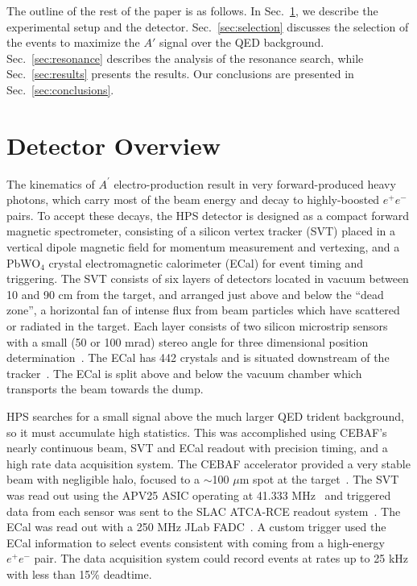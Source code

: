 \documentclass[twocolumn, showpacs, preprintnumbers,prd, superscriptaddress]{revtex4-1}
\newcommand{\pos}{e^{+}}
\newcommand{\ele}{e^{-}}
\newcommand{\epem}{\pos\ele}
\newcommand{\aprime}{A^\prime}
\begin{document}
        The outline of the rest of the paper is as follows. 
        In Sec.~\ref{sec:detector}, we describe the experimental setup and the
        detector. Sec.~\ref{sec:selection} discusses the selection of the 
        events to maximize the $A'$ signal over the QED background.  
        Sec.~\ref{sec:resonance} describes the analysis of the resonance search,
        while Sec.~\ref{sec:results} presents the results.  Our conclusions are 
        presented in Sec.~\ref{sec:conclusions}. 
   
    \section{Detector Overview}\label{sec:detector}	
        
        The kinematics of $\aprime$ electro-production result in very 
        forward-produced heavy photons, which carry most of the beam energy and decay to
        highly-boosted $\epem$ pairs. To accept these decays, the HPS detector is 
        designed as a compact forward magnetic spectrometer, consisting of a silicon
        vertex tracker (SVT) placed in a vertical dipole magnetic field for momentum
        measurement and vertexing, and a PbWO$_4$ crystal electromagnetic calorimeter
       (ECal) for event timing and triggering. The SVT consists of six layers of
        detectors located in vacuum between 10 and 90 cm from the target, and
        arranged just above and below the ``dead zone'', a horizontal fan of intense
        flux from beam particles which have scattered or radiated in the target.
        Each
        layer consists of two silicon microstrip sensors with a small (50 or 100
        mrad) stereo angle for three dimensional position 
        determination~\cite{Adrian:2018}. The ECal  has 442 crystals and is situated downstream of the 
        tracker~\cite{Balossino:2016nly}. The ECal is split above and below the
        vacuum chamber which transports the beam towards the dump.
        
        HPS searches for a small signal above the much larger QED trident background, 
        so it must accumulate high statistics. This was
        accomplished using CEBAF's nearly continuous beam, 
        SVT and ECal readout with precision timing, and a high rate data acquisition
        system. The CEBAF accelerator provided a very stable beam with negligible
        halo, focused to a $\sim$100 $\mu$m spot at the 
        target~\cite{Baltzell:2016eee}. The SVT was read out using the APV25 ASIC operating at 41.333 MHz~\cite{French:2001xb} and triggered data from each sensor was sent to the SLAC ATCA-RCE readout system~\cite{Herbst:2016prn}. The ECal was read out with a 250 MHz 
        JLab FADC~\cite{Dong}. A custom trigger used the ECal information to
        select events consistent with coming from a high-energy $\epem$ pair.
        The data acquisition system could record events at rates up to 25 kHz with less than 15\% deadtime.
        
\end{document}
